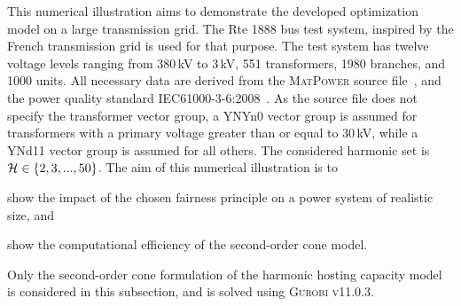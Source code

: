 This numerical illustration aims to demonstrate the developed optimization model on a large transmission grid. The Rte 1888 bus test system, inspired by the French transmission grid is used for that purpose. The test system has twelve voltage levels ranging from 380\,kV to 3\,kV, 551 transformers, 1980 branches, and 1000 units. All necessary data are derived from the \textsc{MatPower} source file~\cite{josz_ac_2016}, and the power quality standard IEC61000-3-6:2008~\cite{international_electrotechnical_commission_iec61000-3-6_2008}. As the source file does not specify the transformer vector group, a YNYn0 vector group is assumed for transformers with a primary voltage greater than or equal to 30\,kV, while a YNd11 vector group is assumed for all others. The considered harmonic set is~$\mathcal{H} \in \{2,3,...,50\}$. The aim of this numerical illustration is to 
\begin{enumerate*}
    \item show the impact of the chosen fairness principle on a power system of realistic size, and
    \item show the computational efficiency of the second-order cone model.
\end{enumerate*}
Only the second-order cone formulation of the harmonic hosting capacity model is considered in this subsection, and is solved using \textsc{Gurobi v11.0.3}. 

